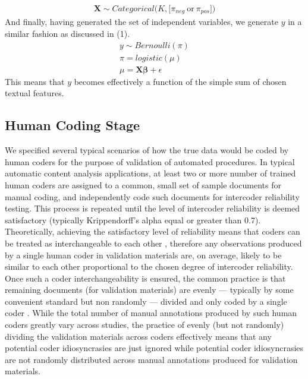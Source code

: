 \documentclass[man, 12pt, a4paper, nolmodern, noextraspace]{apa6}
\begin{document}
    \begin{equation}
        \begin{gathered}
            \boldsymbol{X} \sim Categorical\bigl(K, \bigl[\pi_{neg}\ \textrm{or}\ \pi_{pos}\bigr]\bigr)
        \end{gathered}
    \end{equation}
    And finally, having generated the set of independent variables, we generate $y$ in a similar fashion as discussed in (1).
     \begin{equation}
        \begin{gathered}
            y \sim Bernoulli(\pi) \\
            \pi = logistic(\mu) \\
            \mu = \boldsymbol{X\beta} + \epsilon
        \end{gathered}
    \end{equation}   
This means that $y$ becomes effectively a function of the simple sum of chosen textual features. 

    \subsection{Human Coding Stage}
    
    We specified several typical scenarios of how the true data would be coded by human coders for the purpose of validation of automated procedures. In typical automatic content analysis applications, at least two or more number of trained human coders are assigned to a common, small set of sample documents for manual coding, and independently code such documents for intercoder reliability testing. This process is repeated until the level of intercoder reliability is deemed satisfactory (typically Krippendorff’s alpha equal or greater than 0.7). Theoretically, achieving the satisfactory level of reliability means that coders can be treated as interchangeable to each other \parencite{krippendorff2004reliability}, therefore any observations produced by a single human coder in validation materials are, on average, likely to be similar to each other proportional to the chosen degree of intercoder reliability. Once such a coder interchangeability is ensured, the common practice is that remaining documents (for validation materials) are evenly --- typically by some convenient standard but non randomly --- divided and only coded by a single coder \parencite{grimmer2018unreliability}. While the total number of manual annotations produced by such human coders greatly vary across studies, the practice of evenly (but not randomly) dividing the validation materials across coders effectively means that any potential coder idiosyncrasies are just ignored while potential coder idiosyncrasies are not randomly distributed across manual annotations produced for validation materials.      
    
\end{document}
